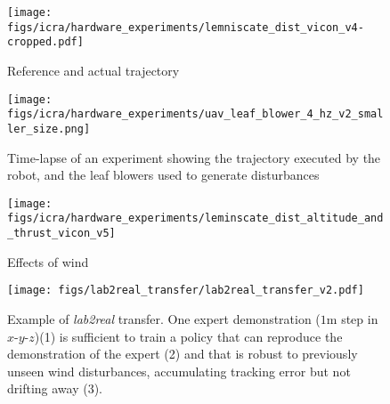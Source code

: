 \begin{figure*}
\captionsetup[sub]{font=footnotesize}
\centering
\begin{subfigure}{0.22\paperwidth}
    \centering
    \texttt{[image: figs/icra/hardware\_experiments/lemniscate\_dist\_vicon\_v4-cropped.pdf]}
    \caption{Reference and actual trajectory}
    \label{fig:reference_and_actual_trajectory}
\end{subfigure}%
\hspace{0.1cm}
\begin{subfigure}{0.38\paperwidth}
    \centering
    \texttt{[image: figs/icra/hardware\_experiments/uav\_leaf\_blower\_4\_hz\_v2\_smaller\_size.png]}
    \caption{Time-lapse of an experiment showing the trajectory executed by the robot, and the leaf blowers used to generate disturbances}
    \label{fig:experiment}
\end{subfigure}%
\hspace{0.12cm}
\begin{subfigure}{0.20\paperwidth}
    \centering
    \texttt{[image: figs/icra/hardware\_experiments/leminscate\_dist\_altitude\_and\_thrust\_vicon\_v5]}
    \caption{Effects of wind}
    \label{fig:thrust_and_altitude}
\end{subfigure}
    \caption{Experimental evaluation of a trajectory tracking policy learned from a \textit{single} linear \ac{RTMPC} demonstration collected in simulation, achieving \textit{zero-shot} transfer. The multirotor is able to withstand previously unseen disturbances, such as the wind produced by an array of leaf-blowers, and whose effects are clearly visible in the altitude errors (and change in commanded thrust) in \cref{fig:thrust_and_altitude}.  
    This demonstration-efficiency and robustness is enabled by Sampling-Augmentation (SA), our proposed tube-guided data augmentation strategy.}
    \label{fig:experiment_lemniscate}
\end{figure*}

\begin{figure}
    \centering
    \texttt{[image: figs/lab2real\_transfer/lab2real\_transfer\_v2.pdf]}
    \caption{Example of \textit{lab2real} transfer. One expert demonstration ($1$m step in $x$-$y$-$z$)(1) is sufficient to train a policy that can reproduce the demonstration of the expert (2) and that is robust to previously unseen wind disturbances, accumulating tracking error but not drifting away (3).}
    \label{fig:lab2real_transfer}
\end{figure}

